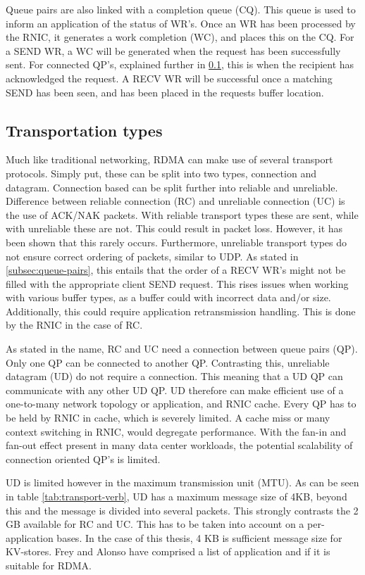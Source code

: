 Queue pairs are also linked with a completion queue (CQ).
This queue is used to inform an application of the status of WR's.
Once an WR has been processed by the RNIC, it generates a work completion (WC), and places this on the CQ.
For a SEND WR, a WC will be generated when the request has been successfully sent.
For connected QP's, explained further in \ref{subsec:transportation-types}, this is when the recipient has acknowledged the request.
A RECV WR will be successful once a matching SEND has been seen, and has been placed in the requests buffer location.

\subsection{Transportation types}\label{subsec:transportation-types}
Much like traditional networking, RDMA can make use of several transport protocols.
Simply put, these can be split into two types, connection and datagram.
Connection based can be split further into reliable and unreliable.
Difference between reliable connection (RC) and unreliable connection (UC) is the use of ACK/NAK packets.
With reliable transport types these are sent, while with unreliable these are not.
This could result in packet loss.
However, it has been shown that this rarely occurs\cite{kalia2014using, kalia2016fasst}.
Furthermore, unreliable transport types do not ensure correct ordering of packets, similar to UDP.
As stated in \ref{subsec:queue-pairs}, this entails that the order of a RECV WR's might not be filled with the appropriate client SEND request.
This rises issues when working with various buffer types, as a buffer could with incorrect data and/or size.
Additionally, this could require application retransmission handling.
This is done by the RNIC in the case of RC.

As stated in the name, RC and UC need a connection between queue pairs (QP).
Only one QP can be connected to another QP.
Contrasting this, unreliable datagram (UD) do not require a connection.
This meaning that a UD QP can communicate with any other UD QP.
UD therefore can make efficient use of a one-to-many network topology or application, and RNIC cache.
Every QP has to be held by RNIC in cache, which is severely limited\cite{qiu2018toward}.
A cache miss or many context switching in RNIC, would degregate performance.
With the fan-in and fan-out effect present in many data center workloads, the potential scalability of connection oriented QP's is limited.

UD is limited however in the maximum transmission unit (MTU).
As can be seen in table \ref{tab:transport-verb}, UD has a maximum message size of 4KB, beyond this and the message is divided into several packets.
This strongly contrasts the 2 GB available for RC and UC.
This has to be taken into account on a per-application bases.
In the case of this thesis, 4 KB is sufficient message size for KV-stores.
Frey and Alonso have comprised a list of application and if it is suitable for RDMA\cite{frey2009minimizing}.

